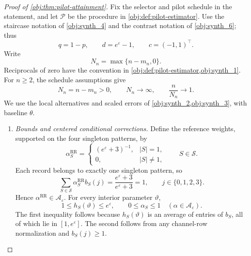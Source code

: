 \begin{proof}[Proof of \cref{obj:thm:pilot-attainment}]
Fix the selector and pilot schedule in the statement, and let \(\mathcal P\) be the procedure in \cref{obj:def:pilot-estimator}. Use the staircase notation of \cref{obj:synth_4} and the contrast notation of \cref{obj:synth_6}; thus
\[
q=1-p,\qquad d=e^\varepsilon-1,\qquad c=(-1,1)^\top.
\]
Write
\[
N_n=\max\{n-m_n,0\}.
\]
Reciprocals of zero have the convention in \cref{obj:def:pilot-estimator,obj:synth_1}. For \(n\ge2\), the schedule assumptions give
\[
N_n=n-m_n>0,\qquad
N_n\longrightarrow\infty,\qquad
\frac{n}{N_n}\longrightarrow1.
\]
We use the local alternatives and scaled errors of \cref{obj:synth_2,obj:synth_3}, with baseline \(\theta\).

\begin{enumerate}
\item \emph{Bounds and centered conditional corrections.}
Define the reference weights, supported on the four singleton patterns, by
\[
\alpha^{\mathrm{RR}}_S=
\begin{cases}
(e^\varepsilon+3)^{-1},& |S|=1,\\
0,& |S|\ne1,
\end{cases}
\qquad S\in\mathcal S.
\]
Each record belongs to exactly one singleton pattern, so
\[
\sum_{S\in\mathcal S}\alpha^{\mathrm{RR}}_S b_S(j)
=\frac{e^\varepsilon+3}{e^\varepsilon+3}=1,
\qquad j\in\{0,1,2,3\}.
\]
Hence \(\alpha^{\mathrm{RR}}\in\mathcal A_\varepsilon\). For every interior parameter \(\vartheta\),
\[
1\le h_S(\vartheta)\le e^\varepsilon,
\qquad
0\le\alpha_S\le1
\quad(\alpha\in\mathcal A_\varepsilon).
\]
The first inequality follows because \(h_S(\vartheta)\) is an average of entries of \(b_S\), all of which lie in \([1,e^\varepsilon]\). The second follows from any channel-row normalization and \(b_S(j)\ge1\).


\end{enumerate}
\end{proof}
